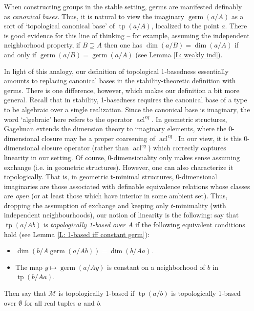 \documentclass{amsart}
\theoremstyle{definition}
\newcommand{\acl}{\operatorname{acl}}
\newcommand{\tp}{\operatorname{tp}}
\begin{document}
When constructing groups in the stable setting, germs are manifested definably as \textit{canonical bases}. Thus, it is natural to view the imaginary $\operatorname{germ}(a/A)$ as a sort of `topological canonical base' of $\tp(a/A)$, localized to the point $a$. There is good evidence for this line of thinking -- for example, assuming the independent neighborhood property, if $B\supseteq A$ then one has $\dim(a/B)=\dim(a/A)$ if and only if $\operatorname{germ}(a/B)=\operatorname{germ}(a/A)$ (see Lemma \ref{L: weakly ind}).

In light of this analogy, our definition of topological 1-basedness essentially amounts to replacing canonical bases in the stability-theoretic definition with germs. There is one difference, however, which makes our definition a bit more general. Recall that in stability, 1-basedness requires the canonical base of a type to be algebraic over a single realization. Since the canonical base is imaginary, the word `algebraic' here refers to the operator $\acl^{eq}$. In geometric structures, Gagelman extends the dimension theory to imaginary elements, where the $0$-dimensional closure may be a proper coarsening of $\acl^{eq}$. In our view, it is this 0-dimensional closure operator (rather than $\acl^{eq}$) which correctly captures linearity in our setting. Of course, 0-dimensionality only makes sense assuming exchange (i.e. in geometric structures). However, one can also characterize it topologically. 
That is, in geometric t-minimal structures, 0-dimensional imaginaries are those associated with definable equivalence relations whose classes are \textit{open} (or at least those which have interior in some ambient set). Thus, dropping the assumption of exchange and keeping only $t$-minimality (with independent neighbourhoods), our notion of linearity is the following:
say that $\tp(a/Ab)$ is \textit{topologically 1-based over $A$} if the following equivalent conditions hold (see Lemma \ref{L: 1-based iff constant germ}):
\begin{itemize}
    \item $\dim(b/A\operatorname{germ}(a/Ab))=\dim(b/Aa)$.
    \item The map $y\mapsto\operatorname{germ}(a/Ay)$ is constant on a neighborhood of $b$ in $\tp(b/Aa)$.
\end{itemize}

Then say that $\mathcal M$ is topologically 1-based if $\tp(a/b)$ is topologically 1-based over $\emptyset$ for all real tuples $a$ and $b$.
\end{document}
